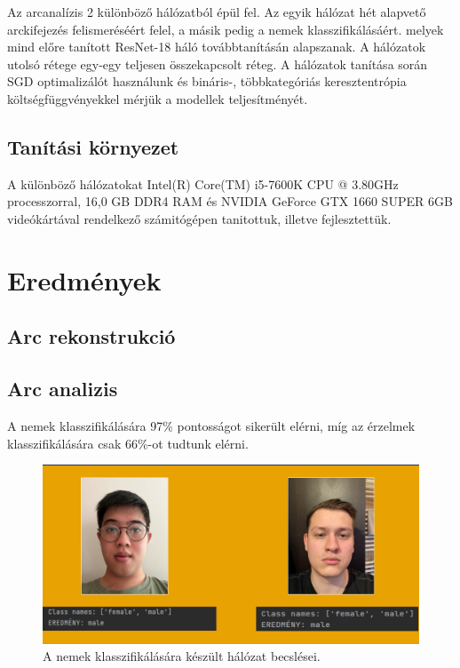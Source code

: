 \documentclass[12pt,a4]{article}
\begin{document}
    Az arcanalízis 2 különböző hálózatból épül fel. Az egyik hálózat hét alapvető arckifejezés felismeréséért felel, a másik pedig a nemek klasszifikálásáért.
    melyek mind előre tanított ResNet-18 háló továbbtanításán alapszanak.
    A hálózatok utolsó rétege egy-egy teljesen összekapcsolt réteg.
    A hálózatok tanítása során SGD optimalizálót használunk és bináris-, többkategóriás keresztentrópia költségfüggvényekkel mérjük a modellek teljesítményét.
    
	\subsection{Tanítási környezet}

    A különböző hálózatokat Intel(R) Core(TM) i5-7600K CPU @ 3.80GHz processzorral, 16,0 GB DDR4 RAM és NVIDIA GeForce GTX 1660 SUPER 6GB videókártával rendelkező számitógépen tanitottuk, illetve fejlesztettük.

    \section{Eredmények}
    \subsection{Arc rekonstrukció}
    \subsection{Arc analizis}
    A nemek klasszifikálására 97\% pontosságot sikerült elérni, míg az érzelmek klasszifikálására csak 66\%-ot tudtunk elérni.

    \begin{figure}[h]	
		\centering
		\includegraphics[width=1\linewidth]{gender}
        \caption{  A nemek klasszifikálására készült hálózat becslései.}
        \label{fig:gender}
	\end{figure}
\end{document}
